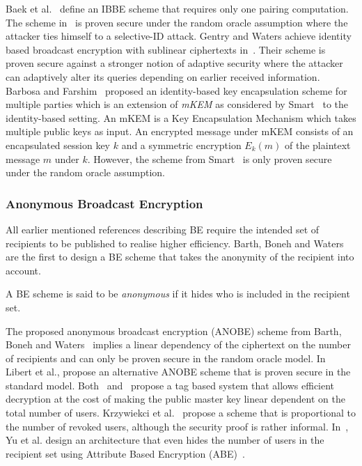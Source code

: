 Baek et al.~\cite{art:BaekNSS04} define an IBBE scheme that requires only one pairing computation. The scheme in~\cite{art:BaekNSS04} is proven secure under the random oracle assumption where the attacker ties himself to a selective-ID attack. Gentry and Waters achieve identity based broadcast encryption with sublinear ciphertexts in~\cite{art:GentryW08}. Their scheme is proven secure against a stronger notion of adaptive security where the attacker can adaptively alter its queries depending on earlier received information. Barbosa and Farshim~\cite{art:BarbosaF05} proposed an identity-based key encapsulation scheme for multiple parties which is an extension of \textit{mKEM} as considered by Smart~\cite{art:Smart04} to the identity-based setting. An mKEM is a Key Encapsulation Mechanism which takes multiple public keys as input. An encrypted message under mKEM consists of an encapsulated session key $k$ and a symmetric encryption $E_k \left( m \right)$ of the plaintext message $m$ under $k$. However, the scheme from Smart~\cite{art:Smart04} is only proven secure under the random oracle assumption.

\subsubsection{Anonymous Broadcast Encryption}
\label{sec:anobe}
All earlier mentioned references describing BE require the intended set of recipients to be published to realise higher efficiency. Barth, Boneh and Waters~\cite{art:BarthBW06} are the first to design a BE scheme that takes the anonymity of the recipient into account.
\begin{defn}[Anonymity]
\label{def:anonymity}
 A BE scheme is said to be \textit{anonymous} if it hides who is included in the recipient set.
\end{defn}

The proposed anonymous broadcast encryption (ANOBE) scheme  from Barth, Boneh and Waters~\cite{art:BarthBW06} implies a linear dependency of the ciphertext on the number of recipients and can only be proven secure in the random oracle model. In~\cite{art:LibertPQ12} Libert et al., propose an alternative ANOBE scheme that is proven secure in the standard model. Both~\cite{art:BarthBW06} and~\cite{art:LibertPQ12} propose a tag based system that allows efficient decryption at the cost of making the public master key linear dependent on the total number of users. Krzywiekci et al.~\cite{art:KrzywieckiKK06} propose a scheme that is proportional to the number of revoked users, although the security proof is rather informal. In~\cite{art:YuRL10}, Yu et al. design an architecture that even hides the number of users in the recipient set using Attribute Based Encryption (ABE)~\cite{art:SahaiW04}.~\cite{art:FazioP12}

